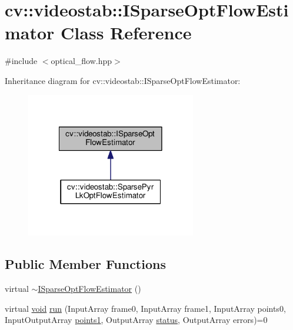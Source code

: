 \hypertarget{classcv_1_1videostab_1_1ISparseOptFlowEstimator}{\section{cv\-:\-:videostab\-:\-:I\-Sparse\-Opt\-Flow\-Estimator Class Reference}
\label{classcv_1_1videostab_1_1ISparseOptFlowEstimator}
}


{\ttfamily \#include $<$optical\-\_\-flow.\-hpp$>$}



Inheritance diagram for cv\-:\-:videostab\-:\-:I\-Sparse\-Opt\-Flow\-Estimator\-:\nopagebreak
\begin{figure}[H]
\begin{center}
\leavevmode
\includegraphics[width=210pt]{classcv_1_1videostab_1_1ISparseOptFlowEstimator__inherit__graph}
\end{center}
\end{figure}
\subsection*{Public Member Functions}
\begin{DoxyCompactItemize}
\item 
virtual \hyperlink{classcv_1_1videostab_1_1ISparseOptFlowEstimator_a9ee3211cc32dc4006223f8c0ee11ecd2}{$\sim$\-I\-Sparse\-Opt\-Flow\-Estimator} ()
\item 
virtual \hyperlink{legacy_8hpp_a8bb47f092d473522721002c86c13b94e}{void} \hyperlink{classcv_1_1videostab_1_1ISparseOptFlowEstimator_aec9ea9902f650a42d7e672a4e331f2fc}{run} (Input\-Array frame0, Input\-Array frame1, Input\-Array points0, Input\-Output\-Array \hyperlink{calib3d_8hpp_a3b72d48e58a35993385885cbc187c91d}{points1}, Output\-Array \hyperlink{tracking_8hpp_ae17b3c2584dab511e91d1c96644018bf}{status}, Output\-Array errors)=0
\end{DoxyCompactItemize}


